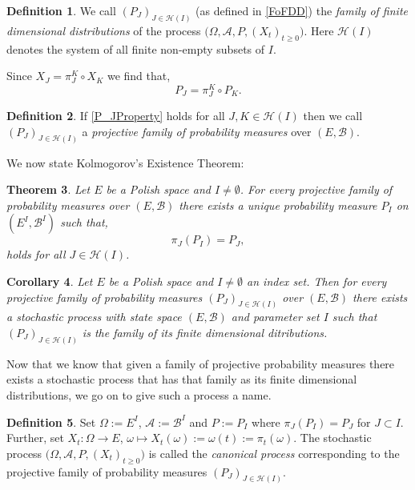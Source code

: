 \documentclass[a4paper, 12pt]{report}
\newtheorem{theorem}{Theorem}[section]
\newtheorem{cor}[theorem]{Corollary}
\theoremstyle{cor}
\theoremstyle{remark}
\theoremstyle{definition}
\newtheorem{defn}[theorem]{Definition}
\begin{document}
\begin{defn}
We call $(P_J)_{J \in \mathcal{H}(I)}$ (as defined in \eqref{FoFDD}) the \emph{family of finite dimensional distributions} of the process $\big(\Omega, \mathcal{A}, P, (X_t)_{t\ge 0}\big)$.  Here $\mathcal{H}(I)$ denotes the system of all finite non-empty subsets of $I$.
\end{defn}
Since $X_J = \pi_J^K\circ X_K$ we find that,
\begin{equation}\label{P_JProperty}
P_J = \pi_J^K\circ P_K.
\end{equation}

\begin{defn}
If \eqref{P_JProperty} holds for all $J, K \in \mathcal{H}(I)$ then we call $(P_J)_{J \in \mathcal{H}(I)}$ a \emph{projective family of probability measures} over $(E, \mathcal{B})$.
\end{defn}
We now state Kolmogorov's Existence Theorem:

\begin{theorem}
Let $E$ be a Polish space and $I \ne \emptyset$.  For every projective family of probability measures over $(E, \mathcal{B})$ there exists a unique probability measure $P_I$ on $(E^I, \mathcal{B}^I)$ such that,
\begin{equation}
\pi_J(P_I) = P_J,
\end{equation}
holds for all $J \in \mathcal{H}(I)$.
\end{theorem}

\begin{cor}
Let $E$ be a Polish space and $I \ne \emptyset$ an index set.  Then for every projective family of probability measures $(P_J)_{J \in \mathcal{H}(I)}$ over $(E, \mathcal{B})$ there exists a stochastic process with state space $(E, \mathcal{B})$ and parameter set $I$ such that $(P_J)_{J \in \mathcal{H}(I)}$ is the family of its finite dimensional ditributions.
\end{cor}

Now that we know that given a family of projective probability measures there exists a stochastic process that has that family as its finite dimensional distributions, we go on to give such a process a name.

\begin{defn}\label{FAaSSPD4}
Set $\Omega := E^I$, $\mathcal{A} := \mathcal{B}^I$ and $P := P_I$ where $\pi_J(P_I) = P_J$ for $J \subset I$.  Further, set $X_t : \Omega \to E$, $\omega \mapsto X_t(\omega) := \omega(t) := \pi_t(\omega)$.  The stochastic process $\big(\Omega, \mathcal{A}, P, (X_t)_{t \ge 0}\big)$ is called the \emph{canonical process} corresponding to the projective family of probability measures $(P_J)_{J \in \mathcal{H}(I)}$.
\end{defn}
\end{document}
